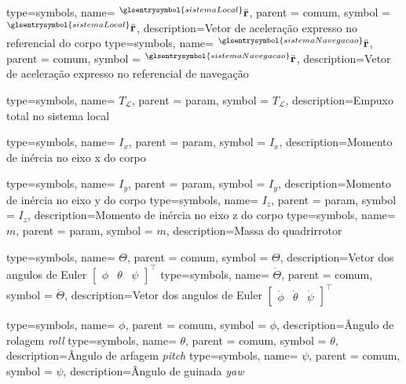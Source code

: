 {type=symbols,
  name= \ensuremath{{}^{\glsentrysymbol{sistemaLocal}}\ddot{\mathbf{r}}},
  parent = {comum},
  symbol = \ensuremath{{}^{\glsentrysymbol{sistemaLocal}}\ddot{\mathbf{r}}},
  description={Vetor de aceleração expresso no referencial do corpo}
}
{type=symbols,
  name= \ensuremath{{}^{\glsentrysymbol{sistemaNavegacao}}\ddot{\mathbf{r}}},
  parent = {comum},
  symbol = \ensuremath{{}^{\glsentrysymbol{sistemaNavegacao}}\ddot{\mathbf{r}}},
  description={Vetor de aceleração expresso no referencial de navegação}
}

{type=symbols,
  name= \ensuremath{T_{\mathcal{L}}},
  parent = {param},
  symbol = \ensuremath{T_{\mathcal{L}}},
  description={Empuxo total no sistema local}
}



{type=symbols,
  name= \ensuremath{I_x},
  parent = {param},
  symbol = \ensuremath{I_x},
  description={Momento de inércia no eixo x do corpo}
}

{type=symbols,
  name= \ensuremath{I_y},
  parent = {param},
  symbol = \ensuremath{I_y},
  description={Momento de inércia no eixo y do corpo}
}
{type=symbols,
  name= \ensuremath{I_z},
  parent = {param},
  symbol = \ensuremath{I_z},
  description={Momento de inércia no eixo z do corpo}
}
{type=symbols,
  name= \ensuremath{m},
  parent = {param},
  symbol = \ensuremath{m},
  description={Massa do quadrirrotor}
}

{type=symbols,
  name= \ensuremath{\boldsymbol{\varTheta}},
  parent = {comum},
  symbol = \ensuremath{\boldsymbol{\varTheta}},
  description={Vetor dos angulos de Euler \ensuremath{\left[\begin{array}{ccc}
\phi & \theta & \psi\end{array}\right]^{\intercal}}}
}
{type=symbols,
  name= \ensuremath{\dot{\boldsymbol{\varTheta}}},
  parent = {comum},
  symbol = \ensuremath{\dot{\boldsymbol{\varTheta}}},
  description={Vetor dos angulos de Euler \ensuremath{\left[\begin{array}{ccc}
\dot{\phi} & \dot{\theta} & \dot{\psi}\end{array}\right]^{\intercal}}}
}


{type=symbols,
  name= \ensuremath{\phi},
  parent = {comum},
  symbol = \ensuremath{\phi},
  description={Ângulo de rolagem \emph{roll}}
}
{type=symbols,
  name= \ensuremath{\theta},
  parent = {comum},
  symbol = \ensuremath{\theta},
  description={Ângulo de arfagem \emph{pitch}}
}
{type=symbols,
  name= \ensuremath{\psi},
  parent = {comum},
  symbol = \ensuremath{\psi},
  description={Ângulo de guinada \emph{yaw}}
}


